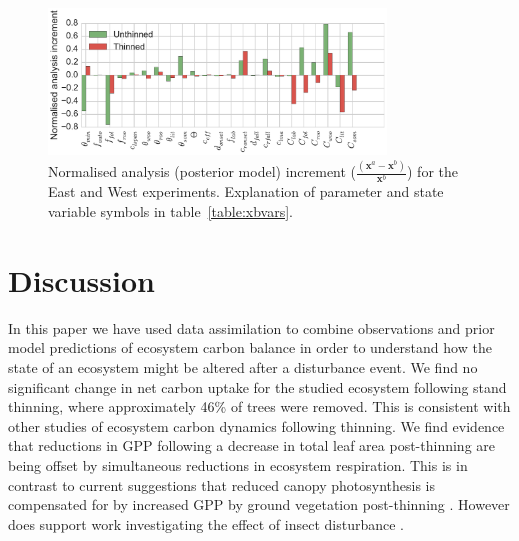 \documentclass[12pt]{article}
\begin{document}
\begin{figure}[ht]
    \centering
    \includegraphics[width=0.8\textwidth]{xa_inc.pdf}
    \caption{Normalised analysis (posterior model) increment \big($\frac{(\textbf{x}^a - \textbf{x}^b)}{\textbf{x}^b}$\big) for the East and West experiments. Explanation of parameter and state variable symbols in table~\ref{table:xbvars}.}
    \label{fig:xa_inc}
\end{figure}

\section{Discussion}
In this paper we have used data assimilation to combine observations and prior model predictions of ecosystem carbon balance in order to understand how the state of an ecosystem might be altered after a disturbance event. We find no significant change in net carbon uptake for the studied ecosystem following stand thinning, where approximately 46\% of trees were removed. This is consistent with other studies of ecosystem carbon dynamics following thinning. We find evidence that reductions in GPP following a decrease in total leaf area post-thinning are being offset by simultaneous reductions in ecosystem respiration. This is in contrast to current suggestions that reduced canopy photosynthesis is compensated for by increased GPP by ground vegetation post-thinning \citep{vesala2005effect, wilkinson2015effects, moreaux2011paired, dore2012recovery}. However does support work investigating the effect of insect disturbance \citep{ELE:ELE12097}.
\end{document}
